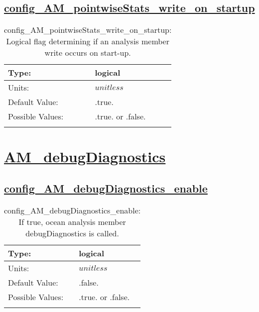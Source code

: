 \subsection[config\_AM\_pointwiseStats\_write\_on\_startup]{\hyperref[sec:nm_tab_AM_pointwiseStats]{config\_AM\_pointwiseStats\_write\_on\_startup}}
\label{subsec:nm_sec_config_AM_pointwiseStats_write_on_startup}
\begin{center}
\begin{longtable}{| p{2.0in} || p{4.0in} |}
    \hline
    Type: & logical \\
    \hline
    Units: & $unitless$ \\
    \hline
    Default Value: & .true. \\
    \hline
    Possible Values: & .true. or .false. \\
    \hline
    \caption{config\_AM\_pointwiseStats\_write\_on\_startup: Logical flag determining if an analysis member write occurs on start-up.}
\end{longtable}
\end{center}
\section[AM\_debugDiagnostics]{\hyperref[sec:nm_tab_AM_debugDiagnostics]{AM\_debugDiagnostics}}
\label{sec:nm_sec_AM_debugDiagnostics}
\subsection[config\_AM\_debugDiagnostics\_enable]{\hyperref[sec:nm_tab_AM_debugDiagnostics]{config\_AM\_debugDiagnostics\_enable}}
\label{subsec:nm_sec_config_AM_debugDiagnostics_enable}
\begin{center}
\begin{longtable}{| p{2.0in} || p{4.0in} |}
    \hline
    Type: & logical \\
    \hline
    Units: & $unitless$ \\
    \hline
    Default Value: & .false. \\
    \hline
    Possible Values: & .true. or .false. \\
    \hline
    \caption{config\_AM\_debugDiagnostics\_enable: If true, ocean analysis member debugDiagnostics is called.}
\end{longtable}
\end{center}
